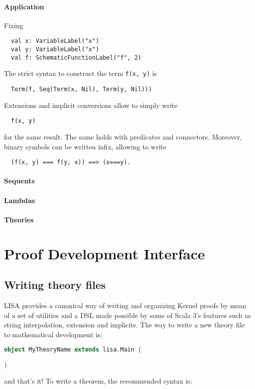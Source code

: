 \paragraph{Application}
Fixing
\begin{lstlisting}
  val x: VariableLabel("x")
  val y: VariableLabel("x")
  val f: SchematicFunctionLabel("f", 2)
\end{lstlisting}
The strict syntax to construct the term \lstinline|f(x, y)| is
\begin{lstlisting}
  Term(f, Seq(Term(x, Nil), Term(y, Nil)))
\end{lstlisting}
Extensions and implicit conversions allow to simply write 
\begin{lstlisting}
  f(x, y)
\end{lstlisting}
for the same result. The same holds with predicates and connectors. Moreover, binary symbols can be written infix, allowing to write

\begin{lstlisting}
  (f(x, y) === f(y, x)) ==> (x===y).
\end{lstlisting}

\paragraph{Sequents}

\paragraph{Lambdas}

\paragraph{Theories}
\section{Proof Development Interface}
\subsection{Writing theory files}
LISA provides a canonical way of writing and organizing Kernel proofs by mean of a set of utilities and a DSL made possible by some of Scala 3's features such as string interpolation, extension and implicits.
The way to write a new theory file to mathematical development is:
\begin{lstlisting}[language=Scala, frame=single]
object MyTheoryName extends lisa.Main {

}
\end{lstlisting}
and that's it! To write a theorem, the recommended syntax is:

